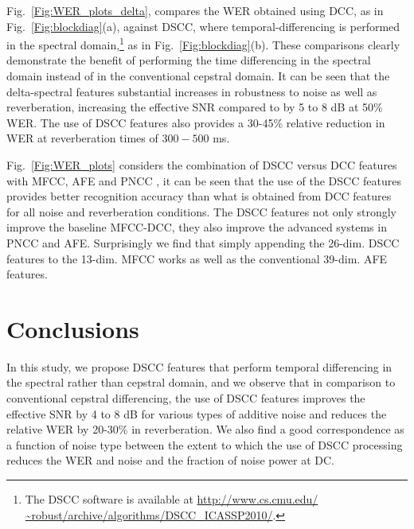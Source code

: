 \documentclass{article}
\begin{document}
Fig.~\ref{Fig:WER_plots_delta},   compares the WER obtained using DCC, as in Fig.~\ref{Fig:blockdiag}(a), against DSCC, where temporal-differencing is performed in the  spectral domain,\footnote{The DSCC software is available at \url{http://www.cs.cmu.edu/ ~robust/archive/algorithms/DSCC_ICASSP2010/}.} as in Fig.~\ref{Fig:blockdiag}(b). These comparisons clearly demonstrate   the benefit of performing the time differencing in the spectral domain instead of in  the conventional cepstral domain. It can be seen that the delta-spectral features   substantial increases in robustness to noise as well as reverberation, increasing the effective SNR compared to by 5 to 8 dB at 50\% WER. The use of  DSCC features also provides a  30-45\% relative reduction in WER at reverberation times of $300-500$ ms.

Fig.~\ref{Fig:WER_plots} considers the combination of DSCC versus DCC features with MFCC, AFE \cite{AFE} and PNCC \cite{PNCC10}, it can be seen that the use of the DSCC features provides better recognition accuracy than what is obtained from DCC features for all noise and   reverberation conditions. The DSCC features not only strongly improve the baseline MFCC-DCC, they also improve the advanced systems in PNCC and AFE. Surprisingly we find that simply appending the 26-dim. DSCC features to the 13-dim. MFCC works as well as the conventional 39-dim. AFE features.

\section{Conclusions}\label{sec:conclusion}
In this study, we    propose   DSCC features that perform temporal differencing in the spectral rather than cepstral domain, and we observe that in comparison to conventional cepstral differencing,  the use of DSCC features improves the effective SNR by 4 to 8 dB for various types of additive noise and reduces the relative WER
by 20-30\% in reverberation.  We also find a good correspondence as a function of noise type between  the  extent to which the use of DSCC processing reduces the WER and noise and the fraction of noise power at DC.
\footnotesize



\end{document}
